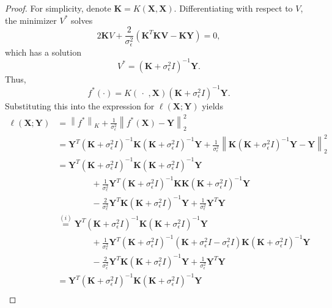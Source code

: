 \documentclass{article}
\theoremstyle{definition}
\theoremstyle{remark}
\newcommand{\norm}[1]{\left \lVert #1 \right \rVert}
\begin{document}
\begin{proof}
For simplicity, denote $\mathbf{K} = K(\mathbf{X},\mathbf{X})$.
Differentiating with respect to $V$, the minimizer $V^*$ solves
\begin{equation}
	2 \mathbf{K} V +\frac{2}{\sigma_{\epsilon}^2} \left( \mathbf{K}^T \mathbf{K} \mathbf{V} -  \mathbf{K} \mathbf{Y} \right) = 0,
\end{equation}
which has a solution
\begin{equation}
V^* = (\mathbf{K} + \sigma_{\epsilon}^2 I)^{-1} \mathbf{Y}.
\end{equation}
Thus,
$$f^*(\cdot) = K\left( \,\cdot\,\,, \mathbf{X} \right)  (\mathbf{K} + \sigma_{\epsilon}^2 I)^{-1} \mathbf{Y}.$$
Substituting this into the expression for $\ell(\mathbf{X};\mathbf{Y})$ yields
\begin{equation} \begin{split}
	\ell(\mathbf{X};\mathbf{Y}) &=  \norm{f^*}_K  + \frac{1}{\sigma_{\epsilon}^2} \norm{ f^*(\mathbf{X}) - \mathbf{Y} }_2^2\\
	&=  \mathbf{Y}^T (\mathbf{K}+\sigma_{\epsilon}^2 I)^{-1} \mathbf{K} (\mathbf{K}+\sigma_{\epsilon}^2 I)^{-1} \mathbf{Y} + \frac{1}{\sigma_{\epsilon}^2} \norm{ \mathbf{K} (\mathbf{K}+ \sigma_{\epsilon}^2 I)^{-1} \mathbf{Y} - \mathbf{Y} }_2^2 \\
&=  \mathbf{Y}^T (\mathbf{K}+\sigma_{\epsilon}^2 I)^{-1} \mathbf{K} (\mathbf{K}+\sigma_{\epsilon}^2 I)^{-1} \mathbf{Y}\\
	&\qquad\qquad + \frac{1}{\sigma_{\epsilon}^2} \mathbf{Y}^T (\mathbf{K}+\sigma_{\epsilon}^2 I)^{-1} \mathbf{K}\mathbf{K} (\mathbf{K}+\sigma_{\epsilon}^2 I)^{-1} \mathbf{Y} \\
	&\qquad\qquad - \frac{2}{\sigma_{\epsilon}^2} \mathbf{Y}^T \mathbf{K} (\mathbf{K}+\sigma_{\epsilon}^2 I)^{-1}\mathbf{Y}  + \frac{1}{\sigma_{\epsilon}^2} \mathbf{Y}^T \mathbf{Y}\\
& \stackrel{(i)}{=} \mathbf{Y}^T (\mathbf{K}+\sigma_{\epsilon}^2 I)^{-1} \mathbf{K} (\mathbf{K}+\sigma_{\epsilon}^2 I)^{-1} \mathbf{Y} \\
	&\qquad\qquad + \frac{1}{\sigma_{\epsilon}^2} \mathbf{Y}^T (\mathbf{K}+\sigma_{\epsilon}^2 I)^{-1} (\mathbf{K} + \sigma_{\epsilon}^2 I - \sigma_{\epsilon}^2 I) \mathbf{K} (\mathbf{K}+\sigma_{\epsilon}^2 I)^{-1} \mathbf{Y} \\
	&\qquad\qquad - \frac{2}{\sigma_{\epsilon}^2} \mathbf{Y}^T \mathbf{K} (\mathbf{K}+\sigma_{\epsilon}^2 I)^{-1} \mathbf{Y}  + \frac{1}{\sigma_{\epsilon}^2} \mathbf{Y}^T \mathbf{Y}\\
&= \mathbf{Y}^T (\mathbf{K}+\sigma_{\epsilon}^2 I)^{-1} \mathbf{K} (\mathbf{K}+\sigma_{\epsilon}^2 I)^{-1} \mathbf{Y} \\

\end{split}
\end{equation}
\end{proof}
\end{document}
